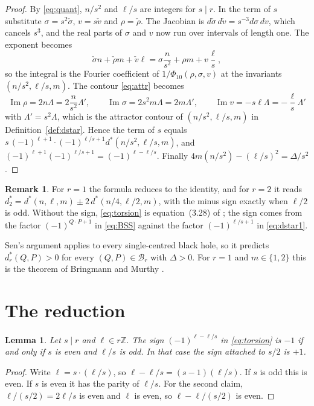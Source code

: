 \documentclass[11pt]{amsart}
\newtheorem{lemma}[theorem]{Lemma}
\theoremstyle{definition}
\newtheorem{remark}[theorem]{Remark}
\newcommand{\ZZ}{\mathbb{Z}}
\newcommand{\cB}{\mathcal B}
\begin{document}
\begin{proof}
By \eqref{eq:quant}, $n/s^2$ and $\ell/s$ are integers for $s\mid r$. In the term of $s$ substitute $\sigma=s^2\check\sigma$, $v=s\check v$ and $\rho=\check\rho$. The Jacobian is $d\check\sigma\,d\check v=s^{-3}d\sigma\,dv$, which cancels $s^3$, and the real parts of $\sigma$ and $v$ now run over intervals of length one. The exponent becomes
\[
\check\sigma n+\check\rho m+\check v\ell=\sigma\frac n{s^2}+\rho m+v\frac\ell s,
\]
so the integral is the Fourier coefficient of $1/\Phi_{10}(\rho,\sigma,v)$ at the invariants $(n/s^2,\ell/s,m)$. The contour \eqref{eq:attr} becomes
\[
\operatorname{Im}\rho=2n\Lambda=2\frac n{s^2}\Lambda',\qquad \operatorname{Im}\sigma=2s^2m\Lambda=2m\Lambda',\qquad \operatorname{Im}v=-s\ell\Lambda=-\frac\ell s\Lambda'
\]
with $\Lambda'=s^2\Lambda$, which is the attractor contour of $(n/s^2,\ell/s,m)$ in Definition~\ref{def:dstar}. Hence the term of $s$ equals $s\,(-1)^{\ell+1}\cdot(-1)^{\ell/s+1}d^*(n/s^2,\ell/s,m)$, and $(-1)^{\ell+1}(-1)^{\ell/s+1}=(-1)^{\ell-\ell/s}$. Finally $4m(n/s^2)-(\ell/s)^2=\Delta/s^2$.
\end{proof}

\begin{remark}\label{rem:torsionone}
For $r=1$ the formula reduces to the identity, and for $r=2$ it reads $d^*_2=d^*(n,\ell,m)\pm2\,d^*(n/4,\ell/2,m)$, with the minus sign exactly when $\ell/2$ is odd. Without the sign, \eqref{eq:torsion} is equation~(3.28) of \cite{DGM11}; the sign comes from the factor $(-1)^{Q\cdot P+1}$ in \eqref{eq:BSS} against the factor $(-1)^{\ell/s+1}$ in \eqref{eq:dstar1}.
\end{remark}

Sen's argument applies to every single-centred black hole, so it predicts $d^*_r(Q,P)>0$ for every $(Q,P)\in\cB_r$ with $\Delta>0$. For $r=1$ and $m\in\{1,2\}$ this is the theorem of Bringmann and Murthy \cite{BM13}.

\section{The reduction}\label{sec:reduction}

\begin{lemma}\label{lem:signs}
Let $s\mid r$ and $\ell\in r\ZZ$. The sign $(-1)^{\ell-\ell/s}$ in \eqref{eq:torsion} is $-1$ if and only if $s$ is even and $\ell/s$ is odd. In that case the sign attached to $s/2$ is $+1$.
\end{lemma}

\begin{proof}
Write $\ell=s\cdot(\ell/s)$, so $\ell-\ell/s=(s-1)(\ell/s)$. If $s$ is odd this is even. If $s$ is even it has the parity of $\ell/s$. For the second claim, $\ell/(s/2)=2\ell/s$ is even and $\ell$ is even, so $\ell-\ell/(s/2)$ is even.
\end{proof}
\end{document}
